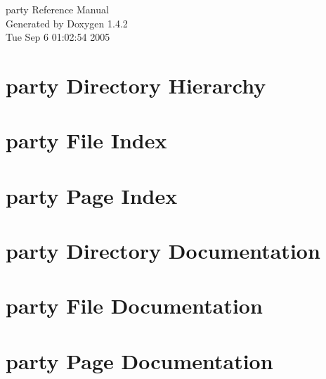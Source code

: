 \documentclass[a4paper]{book}
\begin{document}
\begin{titlepage}
\vspace*{7cm}
\begin{center}
{\Large party Reference Manual}\\
\vspace*{1cm}
{\large Generated by Doxygen 1.4.2}\\
\vspace*{0.5cm}
{\small Tue Sep 6 01:02:54 2005}\\
\end{center}
\end{titlepage}
\clearemptydoublepage
{}
\tableofcontents
\clearemptydoublepage
{}
\chapter{party Directory Hierarchy}

\chapter{party File Index}

\chapter{party Page Index}

\chapter{party Directory Documentation}

\chapter{party File Documentation}




























\chapter{party Page Documentation}

\printindex
\end{document}
